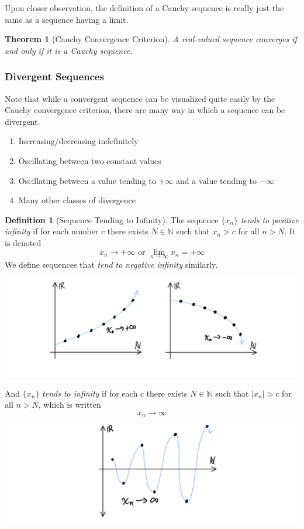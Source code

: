 \documentclass{article}
\newtheorem{theorem}{Theorem}[section]
\theoremstyle{remark}
\theoremstyle{definition}
\newtheorem{definition}{Definition}[section]
\begin{document}
Upon closer observation, the definition of a Cauchy sequence is really just the same as a sequence having a limit. 

\begin{theorem}[Cauchy Convergence Criterion]
A real-valued sequence converges if and only if it is a Cauchy sequence. 
\end{theorem} 

\subsubsection{Divergent Sequences}
Note that while a convergent sequence can be visualized quite easily by the Cauchy convergence criterion, there are many way in which a sequence can be divergent. 
\begin{enumerate}
    \item Increasing/decreasing indefinitely
    \item Oscillating between two constant values
    \item Oscillating between a value tending to $+\infty$ and a value tending to $-\infty$
    \item Many other classes of divergence
\end{enumerate}

\begin{definition}[Sequence Tending to Infinity]
The sequence $\{x_n\}$ \textit{tends to positive infinity} if for each number $c$ there exists $N \in \mathbb{N}$ such that $x_n > c$ for all $n > N$. It is denoted 
\[x_n \rightarrow + \infty \text{ or } \lim_{n \rightarrow \infty} x_n = + \infty\]
We define sequences that \textit{tend to negative infinity} similarly. 
\begin{center}
    \includegraphics[scale=0.3]{img/Positive_Negative_Infinity.PNG}
\end{center}
And $\{x_n\}$ \textit{tends to infinity} if for each $c$ there exists $N \in \mathbb{N}$ such that $|x_n| > c$ for all $n > N$, which is written 
\[x_n \rightarrow \infty\]
\begin{center}
    \includegraphics[scale=0.3]{img/Tending_to_Infinity.PNG}
\end{center}
\end{definition}
\end{document}
